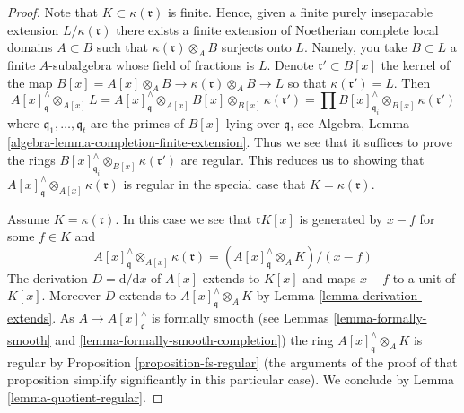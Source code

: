 \documentclass[10pt,a4paper]{amsart}
\theoremstyle{plain}
\theoremstyle{definition}
\theoremstyle{remark}
\numberwithin{equation}{subsection}
\begin{document}
\begin{proof}
Note that $K \subset \kappa(\mathfrak r)$ is finite.
Hence, given a finite purely
inseparable extension $L/\kappa(\mathfrak r)$ there exists a finite
extension of Noetherian complete local domains $A \subset B$ such that
$\kappa(\mathfrak r) \otimes_A B$ surjects onto $L$.
Namely, you take $B \subset L$
a finite $A$-subalgebra whose field of fractions is $L$. Denote
$\mathfrak r' \subset B[x]$ the kernel of the map
$B[x] = A[x] \otimes_A B \to \kappa(\mathfrak r) \otimes_A B \to L$
so that $\kappa(\mathfrak r') = L$. Then
$$
A[x]_\mathfrak q^\wedge \otimes_{A[x]} L =
A[x]_\mathfrak q^\wedge \otimes_{A[x]} B[x]
\otimes_{B[x]} \kappa(\mathfrak r') =
\prod B[x]_{\mathfrak q_i}^\wedge \otimes_{B[x]} \kappa(\mathfrak r')
$$
where $\mathfrak q_1, \ldots, \mathfrak q_t$ are the primes of $B[x]$
lying over $\mathfrak q$, see
Algebra, Lemma \ref{algebra-lemma-completion-finite-extension}.
Thus we see that it suffices to prove the rings
$B[x]_{\mathfrak q_i}^\wedge \otimes_{B[x]} \kappa(\mathfrak r')$
are regular. This reduces us to showing that
$A[x]_\mathfrak q^\wedge \otimes_{A[x]} \kappa(\mathfrak r)$
is regular in the special case that $K = \kappa(\mathfrak r)$.

\medskip\noindent
Assume $K = \kappa(\mathfrak r)$. In this case we see that
$\mathfrak r K[x]$ is generated by $x - f$ for some $f \in K$
and
$$
A[x]_\mathfrak q^\wedge \otimes_{A[x]} \kappa(\mathfrak r)
=
(A[x]_\mathfrak q^\wedge \otimes_A K)/(x - f)
$$
The derivation $D = \text{d}/\text{d}x$ of $A[x]$ extends to $K[x]$ and
maps $x - f$ to a unit of $K[x]$. Moreover $D$ extends to
$A[x]_\mathfrak q^\wedge \otimes_A K$ by Lemma \ref{lemma-derivation-extends}.
As $A \to A[x]_\mathfrak q^\wedge$ is formally smooth (see
Lemmas \ref{lemma-formally-smooth} and
\ref{lemma-formally-smooth-completion})
the ring $A[x]_\mathfrak q^\wedge \otimes_A K$ is regular by
Proposition \ref{proposition-fs-regular} (the arguments of the
proof of that proposition simplify significantly in this particular case).
We conclude by Lemma \ref{lemma-quotient-regular}.
\end{proof}
\end{document}
